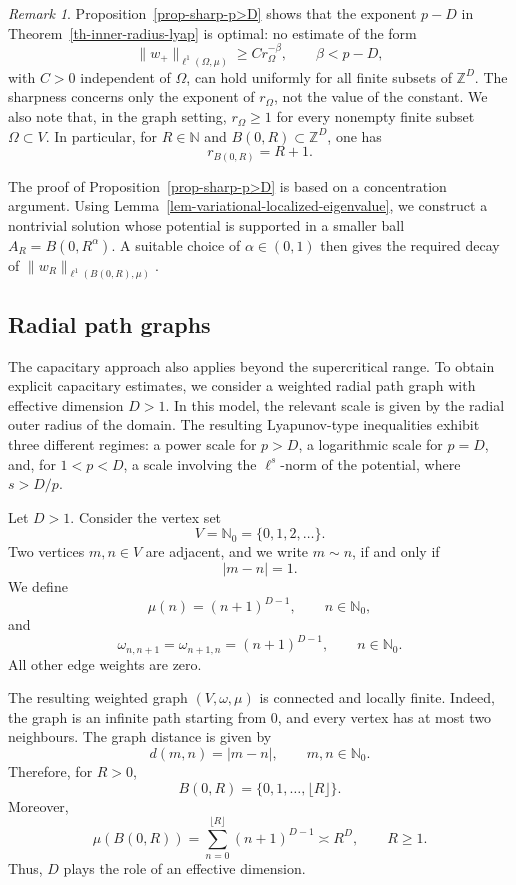 \documentclass[twoside,12pt,letter]{article}
\theoremstyle{plain}
\theoremstyle{definition}
\theoremstyle{remark}
\newtheorem{remark}[theorem]{Remark}
\numberwithin{equation}{section}
\begin{document}
\begin{remark}
Proposition~\ref{prop-sharp-p>D} shows that the exponent \(p-D\) in
Theorem~\ref{th-inner-radius-lyap} is optimal: no estimate of the form
\[
\|w_+\|_{\ell^1(\Omega,\mu)}
\ge C r_\Omega^{-\beta},
\qquad \beta<p-D,
\]
with \(C>0\) independent of \(\Omega\), can hold uniformly for all finite
subsets of \(\mathbb{Z}^D\). The sharpness concerns only the exponent of
\(r_\Omega\), not the value of the constant. We also note that, in the graph
setting, \(r_\Omega\ge 1\) for every nonempty finite subset
\(\Omega\subset V\). In particular, for \(R\in\mathbb{N}\) and
\(B(0,R)\subset\mathbb{Z}^D\), one has
\[
r_{B(0,R)}=R+1.
\]
\end{remark}

The proof of Proposition~\ref{prop-sharp-p>D} is based on a concentration
argument. Using Lemma~\ref{lem-variational-localized-eigenvalue}, we construct
a nontrivial solution whose potential is supported in a smaller ball
\(A_R=B(0,R^\alpha)\). A suitable choice of \(\alpha\in(0,1)\) then gives the
required decay of \(\|w_R\|_{\ell^1(B(0,R),\mu)}\).


\subsection{Radial path graphs}\label{subs-radial}

The capacitary approach also applies beyond the supercritical range. To obtain
explicit capacitary estimates, we consider a weighted radial path graph with
effective dimension \(D>1\). In this model, the relevant scale is given by the
radial outer radius of the domain. The resulting Lyapunov-type inequalities
exhibit three different regimes: a power scale for \(p>D\), a logarithmic scale
for \(p=D\), and, for \(1<p<D\), a scale involving the \(\ell^s\)-norm of the
potential, where \(s>D/p\).


Let \(D>1\). Consider the vertex set
\[
V=\mathbb{N}_0=\{0,1,2,\ldots\}.
\]
Two vertices \(m,n\in V\) are adjacent, and we write \(m\sim n\), if and only if
\[
|m-n|=1.
\]
We define
\[
\mu(n)=(n+1)^{D-1},\qquad n\in\mathbb{N}_0,
\]
and
\[
\omega_{n,n+1}=\omega_{n+1,n}=(n+1)^{D-1},
\qquad n\in\mathbb{N}_0.
\]
All other edge weights are zero.

The resulting weighted graph \((V,\omega,\mu)\) is connected and locally
finite. Indeed, the graph is an infinite path starting from \(0\), and every
vertex has at most two neighbours. The graph distance is given by
\[
d(m,n)=|m-n|,\qquad m,n\in\mathbb{N}_0.
\]
Therefore, for \(R>0\),
\[
B(0,R)=\{0,1,\ldots,\lfloor R\rfloor\}.
\]
Moreover,
\[
\mu(B(0,R))
=
\sum_{n=0}^{\lfloor R\rfloor}(n+1)^{D-1}
\asymp R^D,\qquad R\ge 1.
\]
Thus, \(D\) plays the role of an effective dimension.
\end{document}
